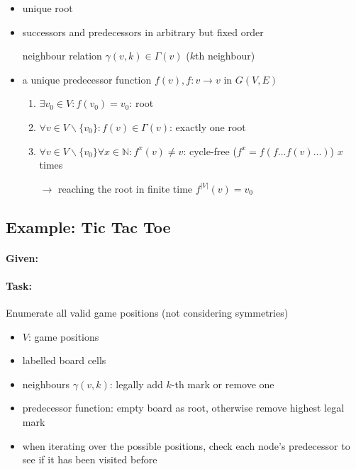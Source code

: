 \documentclass[11pt]{article}
\begin{document}
\begin{itemize}
\item unique root
\item successors and predecessors in arbitrary but fixed order

	neighbour relation $ \gamma(v, k) \in \Gamma(v) $ ($ k $th neighbour)
\item a unique predecessor function $ f(v), f: v \rightarrow v $ in $ G(V, E) $
	\begin{enumerate}
	\item $ \exists v_0 \in V: f(v_0) = v_0 $: root
	\item $ \forall v \in V \backslash \{v_0\}: f(v) \in \Gamma(v) $: exactly one root
	\item $ \forall v \in V \backslash \{v_0\} \forall x \in \mathbb{N}: f^x(v) \neq v $: cycle-free ($ f^x = f(f \dots f(v) \dots) $) $ x $ times
	
		$ \rightarrow $ reaching the root in finite time $ f^{|V|}(v) = v_0 $
	\end{enumerate}

\end{itemize}

\subsection{Example: Tic Tac Toe}

\paragraph{Given:}

\paragraph{Task:} Enumerate all valid game positions (not considering symmetries)

\begin{itemize}
\item $ V $: game positions
\item labelled board cells
\item neighbours $ \gamma (v, k) $: legally add $ k $-th mark or remove one
\item predecessor function: empty board as root, otherwise remove highest legal mark
\item when iterating over the possible positions, check each node's predecessor to see if it has been visited before
\end{itemize}
\end{document}
